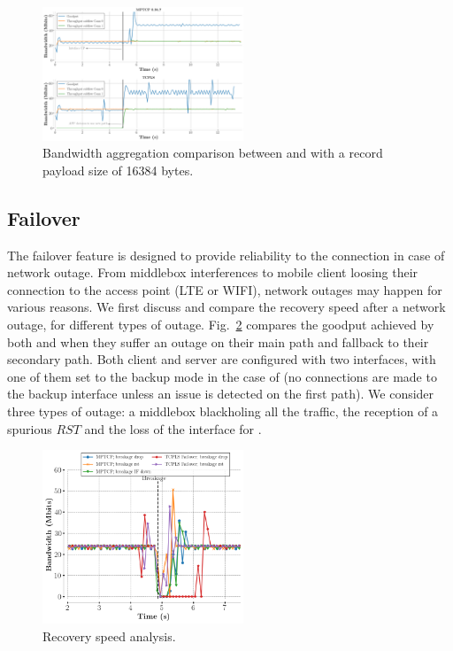 \begin{figure}[!t]
  \begin{center}
    \includegraphics[width=6cm]{figures/aggregate_dual.png}
  \end{center}
\vspace{-0.5cm}
  \caption{Bandwidth aggregation comparison between \mptcp and
    \tcpls with a record payload size of 16384 bytes.}
  \label{fig:multipath_aggregation}
\end{figure}

\subsection{Failover}

The failover feature is designed to provide reliability to the \tcpls connection
in case of network outage. From middlebox interferences to mobile client loosing
their connection to the access point (LTE or WIFI), network outages may happen
for various reasons. We first discuss and compare the recovery speed
after a network outage, for different types of outage. Fig.~\ref{fig:recovery}
compares the goodput achieved by both \mptcp and \tcpls when they suffer an
outage on their main path and fallback to their secondary path. Both client and
server are configured with two interfaces, with one of them set to the backup
mode in the case of \mptcp (no connections are made to the backup interface
unless an issue is detected on the first path). We consider three types of
outage: a middlebox blackholing all the traffic, the reception of a spurious
$RST$ and the loss of the interface for \mptcp.

\begin{figure}[!t]
  \begin{center}
    \includegraphics[width=6cm]{figures/breakage_analysis.png}
  \end{center}
\vspace{-0.5cm}
  \caption{Recovery speed analysis.}
  \label{fig:recovery}
\end{figure}


